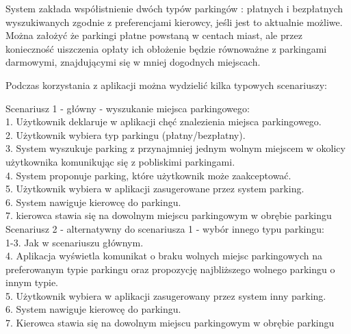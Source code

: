 System zakłada współistnienie dwóch typów parkingów : płatnych  i bezpłatnych wyszukiwanych zgodnie z preferencjami kierowcy, jeśli jest to aktualnie możliwe. Można założyć że parkingi płatne powstaną w centach miast, ale przez konieczność uiszczenia opłaty ich obłożenie będzie równoważne z parkingami darmowymi, znajdującymi się w mniej dogodnych miejscach.

\noindent Podczas korzystania z aplikacji można wydzielić kilka  typowych scenariuszy:


\noindent Scenariusz 1 - główny - wyszukanie miejsca parkingowego: \\
\hspace*{1cm} 1. Użytkownik deklaruje w aplikacji chęć znalezienia miejsca parkingowego. \\
\hspace*{1cm} 2. Użytkownik wybiera typ parkingu (płatny/bezpłatny). \\
\hspace*{1cm} 3. System wyszukuje parking z przynajmniej jednym wolnym miejscem w okolicy użytkownika komunikując się z pobliskimi parkingami. \\
\hspace*{1cm} 4. System proponuje parking, które użytkownik może zaakceptować. \\
\hspace*{1cm} 5. Użytkownik wybiera w aplikacji zasugerowane przez system parking. \\
\hspace*{1cm} 6. System nawiguje kierowcę do parkingu. \\
\hspace*{1cm} 7. kierowca stawia się na dowolnym miejscu parkingowym w obrębie parkingu \\

\noindent Scenariusz 2 - alternatywny do scenariusza 1 - wybór innego typu parkingu: \\
\hspace*{1cm} 1-3. Jak w scenariuszu głównym. \\
\hspace*{1cm} 4. Aplikacja wyświetla komunikat o braku wolnych miejsc parkingowych na preferowanym typie parkingu oraz propozycję najbliższego wolnego parkingu o innym typie.  \\
\hspace*{1cm} 5. Użytkownik wybiera w aplikacji zasugerowany przez system inny parking. \\
\hspace*{1cm} 6. System nawiguje kierowcę do parkingu. \\
\hspace*{1cm} 7. Kierowca stawia się na dowolnym miejscu parkingowym w obrębie parkingu \\



